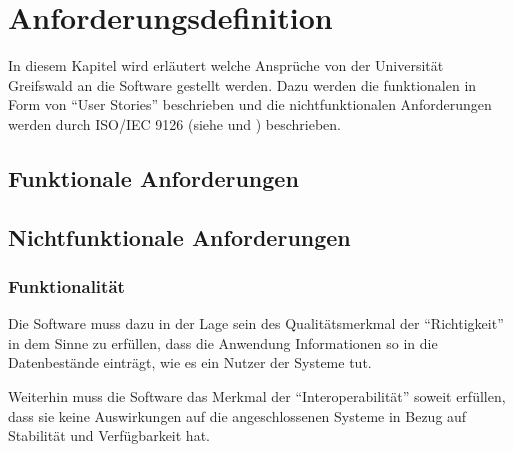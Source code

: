 \chapter{Anforderungsdefinition} %
\label{sec:Anforderungen}
\vspace{-3cm}
\begin{flushleft}
In diesem Kapitel wird erläutert welche Ansprüche von der Universität Greifswald an die Software gestellt werden.
Dazu werden die funktionalen in Form von ``User Stories'' beschrieben und die nichtfunktionalen Anforderungen werden durch ISO/IEC 9126 (siehe \cite{ISO9126} und \cite{ISO}) beschrieben.


\section{Funktionale Anforderungen} %
\label{sec:Funktionale Anforderungen}



 \newpage
\section{Nichtfunktionale Anforderungen} %
\label{sec:Nichtfunktionale Anforderungen}

\subsection{Funktionalität} %
\label{sub:Funktionalitaet}

Die Software muss dazu in der Lage sein des Qualitätsmerkmal der ``Richtigkeit'' in dem Sinne zu erfüllen, dass die Anwendung Informationen so in 
die Datenbestände einträgt, wie es ein Nutzer der Systeme tut.

Weiterhin muss die Software das Merkmal der ``Interoperabilität'' soweit erfüllen, dass sie keine Auswirkungen auf die angeschlossenen Systeme in Bezug auf 
Stabilität und Verfügbarkeit hat. 


\end{flushleft}
